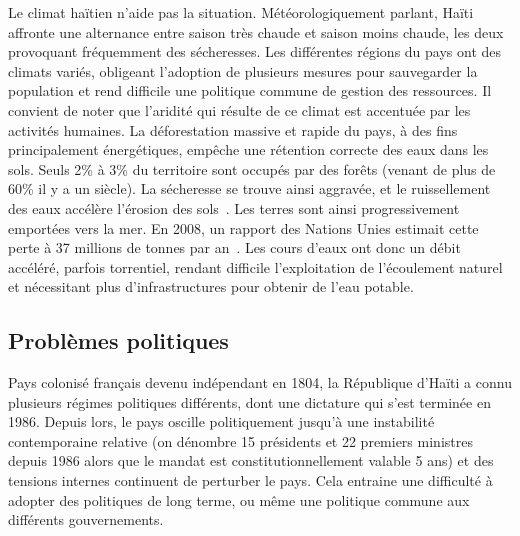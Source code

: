 \documentclass{EPL-master-thesis-covers-FR}
\begin{document}
				Le climat haïtien n'aide pas la situation. Météorologiquement parlant, Haïti affronte une alternance entre saison très chaude et saison moins chaude, les deux provoquant fréquemment des sécheresses. Les différentes régions du pays ont des climats variés, obligeant l'adoption de plusieurs mesures pour sauvegarder la population et rend difficile une politique commune de gestion des ressources. Il convient de noter que l'aridité qui résulte de ce climat est accentuée par les activités humaines. La déforestation massive et rapide du pays, à des fins principalement énergétiques, empêche une rétention correcte des eaux dans les sols. Seuls 2\% à 3\% du territoire sont occupés par des forêts (venant de plus de 60\% il y a un siècle). La sécheresse se trouve ainsi aggravée, et le ruissellement des eaux accélère l'érosion des sols~\cite{ref:desertification_of_haiti}. Les terres sont ainsi progressivement emportées vers la mer. En 2008, un rapport des Nations Unies estimait cette perte à 37 millions de tonnes par an~\cite{ref:impact_degradation_terre}. Les cours d'eaux ont donc un débit accéléré, parfois torrentiel, rendant difficile l'exploitation de l'écoulement naturel et nécessitant plus d'infrastructures pour obtenir de l'eau potable.

			\subsection*{Problèmes politiques}

				Pays colonisé français devenu indépendant en 1804, la République d'Haïti a connu plusieurs régimes politiques différents, dont une dictature qui s'est terminée en 1986. Depuis lors, le pays oscille politiquement jusqu'à une instabilité contemporaine relative (on dénombre 15 présidents et 22 premiers ministres depuis 1986 alors que le mandat est constitutionnellement valable 5 ans) et des tensions internes continuent de perturber le pays. Cela entraine une difficulté à adopter des politiques de long terme, ou même une politique commune aux différents gouvernements.
\end{document}
